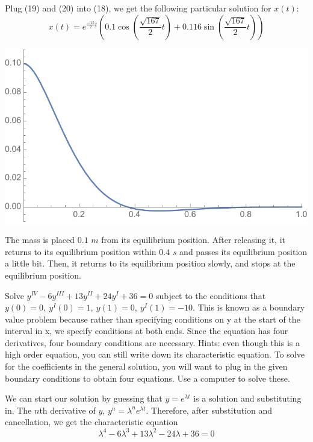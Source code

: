 \documentclass[11pt,answers]{exam}
\begin{document}
\begin{questions}
\begin{solution}
Plug (19) and (20) into (18), we get the following particular solution for $x(t)$:
\begin{equation}
x(t) = e^{\frac{-15}{2} t} ( 0.1 \cos{(\frac{\sqrt{167}}{2} t)} + 0.116 \sin{(\frac{\sqrt{167}}{2}t)})
\end{equation}



\includegraphics{p17plot.pdf}

The mass is placed $0.1$ $m$ from its equilibrium position. After releasing it, it returns to its equilibrium position within $0.4$ $s$ and passes its equilibrium position a little bit. Then, it returns to its equilibrium position slowly, and stops at the equilibrium position. 

\end{solution}

\item Solve $y^{IV} - 6y^{III} + 13y^{II} + 24y^I + 36 = 0$ subject to the conditions that $y(0) = 0, \: y^I(0) = 1, \: y(1) = 0, \: y^I(1) = -10$.  This is known as a boundary value problem because rather than specifying conditions on y at the start of the interval in x, we specify conditions at both ends. Since the equation has four derivatives, four boundary conditions are necessary. Hints: even though this is a high order equation, you can still write down its characteristic equation. To solve for the coefficients in the general solution, you will want to plug in the given boundary conditions to obtain four equations. Use a computer to solve these.

\begin{solution}

We can start our solution by guessing that $y = e^{\lambda t}$ is a solution and substituting in.  The $n$th derivative of $y$, $y^n = \lambda^ne^{\lambda t}$.  Therefore, after substitution and cancellation, we get the characteristic equation
\[
\lambda^4 - 6\lambda^3 + 13\lambda^2 - 24\lambda + 36 = 0
\]


\end{solution}
\end{questions}
\end{document}
